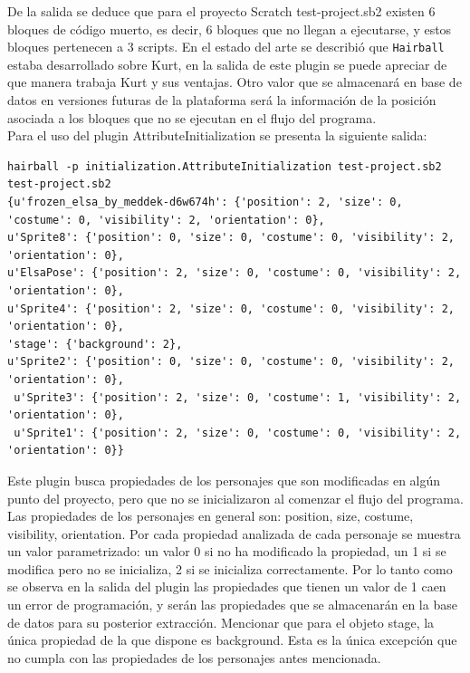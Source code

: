 \documentclass[a4paper, 12pt]{book}
\begin{document}
De la salida se deduce que para el proyecto Scratch test-project.sb2 existen 6 bloques de código
muerto, es decir, 6 bloques que no llegan a ejecutarse, y estos bloques pertenecen a 3 scripts. 
En el estado del arte se describió que \texttt{Hairball} estaba desarrollado sobre Kurt, en la
salida de este plugin se puede apreciar de que manera trabaja Kurt y sus ventajas. Otro valor
que se almacenará en base de datos en versiones futuras de la plataforma será la información de 
la posición asociada a los bloques que no se ejecutan en el flujo del programa. \\ 

Para el uso del plugin AttributeInitialization se presenta la siguiente salida:

\begingroup
\fontsize{8pt}{8pt}\selectfont
\begin{verbatim}
hairball -p initialization.AttributeInitialization test-project.sb2 
test-project.sb2
{u'frozen_elsa_by_meddek-d6w674h': {'position': 2, 'size': 0, 'costume': 0, 'visibility': 2, 'orientation': 0}, 
u'Sprite8': {'position': 0, 'size': 0, 'costume': 0, 'visibility': 2, 'orientation': 0}, 
u'ElsaPose': {'position': 2, 'size': 0, 'costume': 0, 'visibility': 2, 'orientation': 0}, 
u'Sprite4': {'position': 2, 'size': 0, 'costume': 0, 'visibility': 2, 'orientation': 0}, 
'stage': {'background': 2}, 
u'Sprite2': {'position': 0, 'size': 0, 'costume': 0, 'visibility': 2, 'orientation': 0},
 u'Sprite3': {'position': 2, 'size': 0, 'costume': 1, 'visibility': 2, 'orientation': 0},
 u'Sprite1': {'position': 2, 'size': 0, 'costume': 0, 'visibility': 2, 'orientation': 0}}
\end{verbatim}
\endgroup

Este plugin busca propiedades de los personajes que son modificadas en algún punto del 
proyecto, pero que no se inicializaron al comenzar el flujo del programa. Las propiedades 
de los personajes en general son: position, size, costume, visibility, orientation. 
Por cada propiedad analizada de cada personaje se muestra un valor parametrizado: un valor 
0 si no ha modificado la propiedad, un 1 si se modifica pero no se inicializa, 2 si se inicializa
correctamente. Por lo tanto como se observa en la salida del plugin las propiedades que tienen
 un valor de 1 caen un error de programación, y serán las propiedades que se almacenarán en la
base de datos para su posterior extracción. Mencionar que para el objeto stage, la única 
propiedad de la que dispone es background. Esta es la única excepción que no cumpla con 
las propiedades de los personajes antes mencionada. \\
\end{document}
